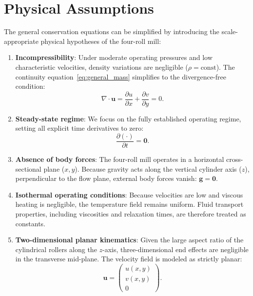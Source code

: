 \section{Physical Assumptions}
\label{sec:physical_assumptions}

The general conservation equations can be simplified by introducing the scale-appropriate physical hypotheses of the four-roll mill:

\begin{enumerate}
    \item \textbf{Incompressibility}:
    Under moderate operating pressures and low characteristic velocities, density variations are negligible ($\rho = \text{const}$).
    The continuity equation~\eqref{eq:general_mass} simplifies to the divergence-free condition:
    \begin{equation}
        \nabla \cdot \boldsymbol{u} = \frac{\partial u}{\partial x} + \frac{\partial v}{\partial y} = 0 .
        \label{eq:incompressibility}
    \end{equation}

    \item \textbf{Steady-state regime}:
    We focus on the fully established operating regime, setting all explicit time derivatives to zero:
    \begin{equation}
        \frac{\partial (\cdot)}{\partial t} = \boldsymbol{0} .
        \label{eq:steady_state_assumption}
    \end{equation}

    \item \textbf{Absence of body forces}:
    The four-roll mill operates in a horizontal cross-sectional plane ($x, y$).
    Because gravity acts along the vertical cylinder axis ($z$), perpendicular to the flow plane, external body forces vanish: $\boldsymbol{g} = \boldsymbol{0}$.

    \item \textbf{Isothermal operating conditions}:
    Because velocities are low and viscous heating is negligible, the temperature field remains uniform.
    Fluid transport properties, including viscosities and relaxation times, are therefore treated as constants.

    \item \textbf{Two-dimensional planar kinematics}:
    Given the large aspect ratio of the cylindrical rollers along the $z$-axis,
    three-dimensional end effects are negligible in the transverse mid-plane.
    The velocity field is modeled as strictly planar:
    \begin{equation}
        \boldsymbol{u} = \begin{pmatrix} u(x, y) \\ v(x, y) \\ 0 \end{pmatrix} .
        \label{eq:planar_velocity_assumption}
    \end{equation}
\end{enumerate}

